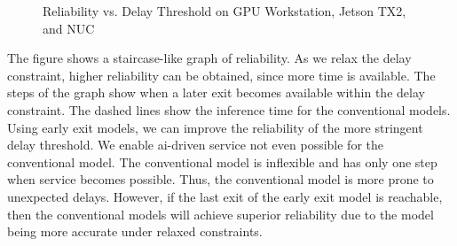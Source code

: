 \begin{figure}
	\caption[Reliability vs. Computation Latency]{Reliability vs. Delay Threshold on \protect{} GPU Workstation, \protect{} Jetson TX2, and \protect{} NUC}
	\label{fig:delay-threshold}
\end{figure}
The figure shows a staircase-like graph of reliability. As we relax the delay constraint, higher reliability can be obtained, since more time is available. The steps of the graph show when a later exit becomes available within the delay constraint. The dashed lines show the inference time for the conventional models. Using early exit models, we can improve the reliability of the more stringent delay threshold. We enable \gls{ai}-driven service not even possible for the conventional model. The conventional model is inflexible and has only one step when service becomes possible. Thus, the conventional model is more prone to unexpected delays. However, if the last exit of the early exit model is reachable, then the conventional models will achieve superior reliability due to the model being more accurate under relaxed constraints. 

